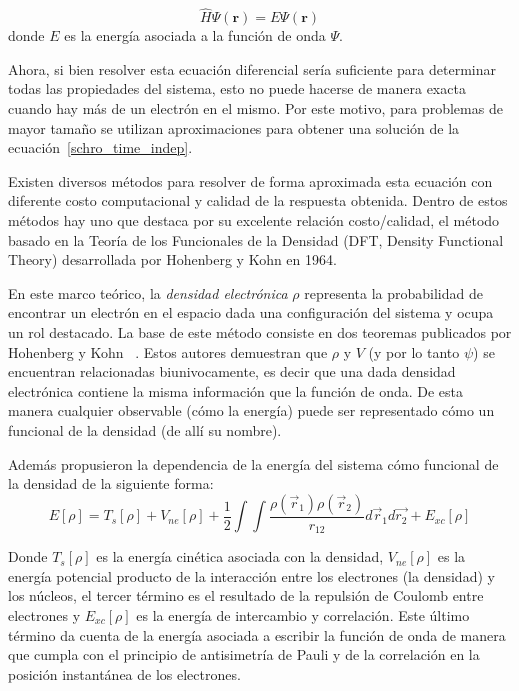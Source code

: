\begin{equation}
    \label{schro_time_indep}
    \hat{H} \Psi(\mathbf{r}) = E \Psi(\mathbf{r})
\end{equation}
donde $E$ es la energ\'ia asociada a la funci\'on de onda $\Psi$.

Ahora, si bien resolver esta ecuaci\'on diferencial ser\'ia suficiente para determinar todas las propiedades del sistema, esto no puede hacerse de
manera exacta cuando hay m\'as de un electr\'on en el mismo. Por este motivo, para problemas de mayor tama\~no se utilizan aproximaciones
para obtener una soluci\'on de la ecuaci\'on~\ref{schro_time_indep}.

Existen diversos m\'etodos para resolver de forma aproximada esta ecuaci\'on con diferente costo computacional y calidad de la respuesta obtenida. 
Dentro de estos m\'etodos hay uno que destaca por su excelente relaci\'on costo/calidad, el m\'etodo basado en la Teor\'ia de los Funcionales de la Densidad (DFT, Density Functional Theory) desarrollada por Hohenberg y Kohn en 1964.

En este marco te\'orico, la \textit{densidad electr\'onica} $\rho$ representa la probabilidad de encontrar un electr\'on en el espacio dada una configuraci\'on del sistema y ocupa un rol destacado.
La base de este m\'etodo consiste en dos teoremas publicados por Hohenberg y Kohn ~\cite{HohenbergKohn}.
Estos autores demuestran que $\rho$ y $V$ (y por lo tanto $\psi$) se encuentran relacionadas biunivocamente,
es decir que una dada densidad electr\'onica contiene la misma informaci\'on que la funci\'on de onda.
De esta manera cualquier observable (c\'omo la energ\'ia) puede ser representado c\'omo un funcional de la densidad (de all\'i su nombre).

Adem\'as propusieron la dependencia de la energ\'ia del sistema c\'omo funcional de la densidad de la siguiente forma:
\begin{equation}
    \label{hohenberg_kohn_energy}
    E[\rho] = T_s[\rho] + V_{ne}[\rho] + \frac{1}{2} \int \int \frac{\rho(\vec{r}_1) \rho(\vec{r}_2)}{r_{12}} d\vec{r}_1 d\vec{r_2} + E_{xc}[\rho]
\end{equation}

Donde $T_s[\rho]$ es la energ\'ia cin\'etica asociada con la densidad, $V_{ne}[\rho]$ es la energ\'ia potencial producto de la interacci\'on entre los
electrones (la densidad) y los n\'ucleos, el tercer t\'ermino es el resultado de la repulsi\'on de Coulomb entre electrones y $E_{xc}[\rho]$ es la
energ\'ia de intercambio y correlaci\'on. Este \'ultimo t\'ermino da cuenta de la energ\'ia asociada a escribir la funci\'on de onda de manera que cumpla con el principio de antisimetr\'ia de Pauli y de la correlaci\'on
en la posici\'on instant\'anea de los electrones.

